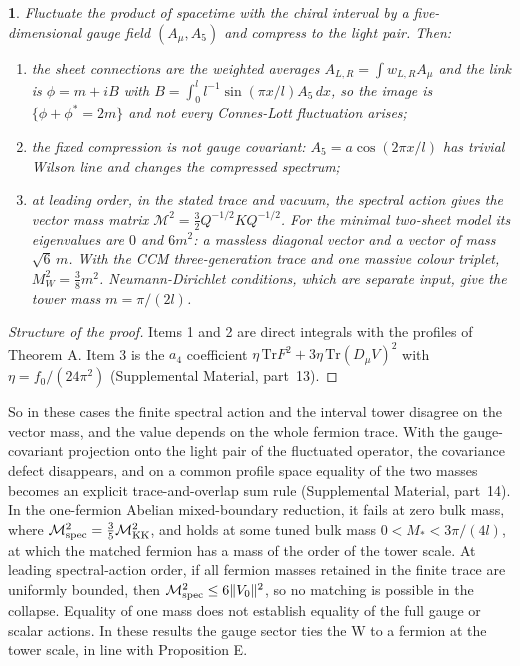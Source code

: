 \documentclass[aps,prd,reprint,onecolumn,nofootinbib,amsmath,amssymb,floatfix]{revtex4-2}
\theoremstyle{plain}
\newcommand{\resultname}{}
\newtheorem*{resultenv}{\resultname}
\newenvironment{result}[1]{\renewcommand{\resultname}{#1}\begin{resultenv}}{\end{resultenv}}
\newcommand{\supp}[1]{Supplemental Material, part~#1}
\begin{document}
\begin{result}{Proposition F}
Fluctuate the product of spacetime with the chiral interval by a five-dimensional gauge field $(A_\mu,A_5)$ and compress to the light pair. Then:
\begin{enumerate}
\item the sheet connections are the weighted averages $A_{L,R}=\int w_{L,R}A_\mu$ and the link is $\phi=m+iB$ with $B=\int_0^ll^{-1}\sin(\pi x/l)A_5\,dx$, so the image is $\{\phi+\phi^*=2m\}$ and not every Connes-Lott fluctuation arises;
\item the fixed compression is not gauge covariant: $A_5=a\cos(2\pi x/l)$ has trivial Wilson line and changes the compressed spectrum;
\item at leading order, in the stated trace and vacuum, the spectral action gives the vector mass matrix $\mathcal M^2=\tfrac32Q^{-1/2}KQ^{-1/2}$. For the minimal two-sheet model its eigenvalues are $0$ and $6m^2$: a massless diagonal vector and a vector of mass $\sqrt6\,m$. With the CCM three-generation trace and one massive colour triplet, $M_W^2=\tfrac38m^2$. Neumann-Dirichlet conditions, which are separate input, give the tower mass $m=\pi/(2l)$.
\end{enumerate}
\end{result}

\begin{proof}[Structure of the proof]
Items 1 and 2 are direct integrals with the profiles of Theorem A. Item 3 is the $a_4$ coefficient $\eta\,\mathrm{Tr}F^2+3\eta\,\mathrm{Tr}(D_\mu V)^2$ with $\eta=f_0/(24\pi^2)$ (\supp{13}).
\end{proof}

So in these cases the finite spectral action and the interval tower disagree on the vector mass, and the value depends on the whole fermion trace. With the gauge-covariant projection onto the light pair of the fluctuated operator, the covariance defect disappears, and on a common profile space equality of the two masses becomes an explicit trace-and-overlap sum rule (\supp{14}). In the one-fermion Abelian mixed-boundary reduction, it fails at zero bulk mass, where $\mathcal M_{\rm spec}^2=\tfrac35\mathcal M_{\rm KK}^2$, and holds at some tuned bulk mass $0<M_*<3\pi/(4l)$, at which the matched fermion has a mass of the order of the tower scale. At leading spectral-action order, if all fermion masses retained in the finite trace are uniformly bounded, then $\mathcal M_{\rm spec}^2\le6\|V_0\|^2$, so no matching is possible in the collapse. Equality of one mass does not establish equality of the full gauge or scalar actions. In these results the gauge sector ties the W to a fermion at the tower scale, in line with Proposition E.
\end{document}
